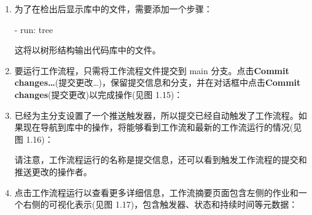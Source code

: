 \begin{enumerate}
在工作流编辑器的右侧是市场，可以直接在那里搜索 Action。搜索检出(checkout)并找到来自 actions 的 Action(这些是 GitHub 的内置 Action)。列表包含一个安装部分，可以将其复制到工作流中以使用该 Action(见图 1.14)：


请注意，许多参数是可选的。为了checkout代码库，只需要以下几行信息即可：

\begin{shell}
- name: Checkout
  uses: actions/checkout@v4.1.0
\end{shell}

\begin{myNotic}{使用GitHub Actions}
指向 GitHub 上的一个位置。语法是 \{path\}@\{ref\}。路径指向 GitHub 上的物理位置，如果 Actions 在代码库的根目录中，则为 \{owner\}/\{repo\}，如果 Actions 在子文件夹中，则为 \{owner\}/\{repo\}/\{path\}。@\{ref\} 之后的引用指向提交的 git 引用，可以是一个标签、分支或单个提交 SHA 码。
\end{myNotic}

\item 
为了在检出后显示库中的文件，需要添加一个步骤：

\begin{shell}
- run: tree
\end{shell}

这将以树形结构输出代码库中的文件。

\item 
要运行工作流程，只需将工作流程文件提交到 main 分支。点击\textbf{Commit changes…}(提交更改…)，保留提交信息和分支，并在对话框中点击\textbf{Commit changes}(提交更改)以完成操作(见图 1.15)：


\item 
已经为主分支设置了一个推送触发器，所以提交已经自动触发了工作流程。如果现在导航到库中的操作，将能够看到工作流和最新的工作流运行的情况(见图 1.16)：


请注意，工作流程运行的名称是提交信息，还可以看到触发工作流程的提交和推送更改的操作者。

\item 
点击工作流程运行以查看更多详细信息，工作流摘要页面包含左侧的作业和一个右侧的可视化表示(见图 1.17)，包含触发器、状态和持续时间等元数据：


\end{enumerate}
